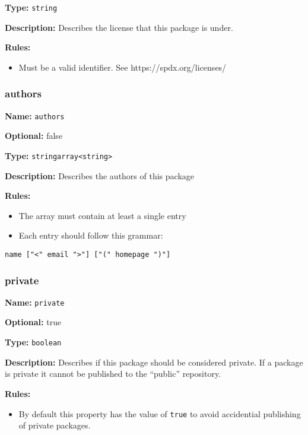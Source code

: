 \textbf{Type:} \texttt{string}

\textbf{Description:} Describes the license that this package is under.

\textbf{Rules:}

\begin{itemize}
\tightlist
\item
  Must be a valid identifier. See https://spdx.org/licenses/
\end{itemize}

\hypertarget{authors}{\subsubsection{authors}\label{authors}}

\textbf{Name:} \texttt{authors}

\textbf{Optional:} false

\textbf{Type:}
\texttt{string\textbar{}array\textless{}string\textgreater{}}

\textbf{Description:} Describes the authors of this package

\textbf{Rules:}

\begin{itemize}
\tightlist
\item
  The array must contain at least a single entry
\item
  Each entry should follow this grammar:
\end{itemize}

\begin{verbatim}
name ["<" email ">"] ["(" homepage ")"]
\end{verbatim}

\hypertarget{private}{\subsubsection{private}\label{private}}

\textbf{Name:} \texttt{private}

\textbf{Optional:} true

\textbf{Type:} \texttt{boolean}

\textbf{Description:} Describes if this package should be considered
private. If a package is private it cannot be published to the
``public'' repository.

\textbf{Rules:}

\begin{itemize}
\tightlist
\item
  By default this property has the value of \texttt{true} to avoid
  accidential publishing of private packages.
\end{itemize}

